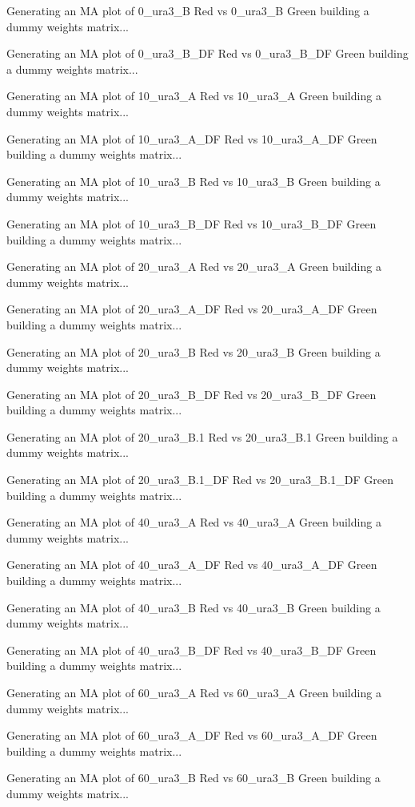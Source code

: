 \documentclass[titlepage]{article}
\begin{document}
\begin{Schunk}
\begin{Soutput}
Generating an MA plot of  0_ura3_B Red vs 0_ura3_B Green 
building a dummy weights matrix... 

Generating an MA plot of  0_ura3_B_DF Red vs 0_ura3_B_DF Green 
building a dummy weights matrix... 

Generating an MA plot of  10_ura3_A Red vs 10_ura3_A Green 
building a dummy weights matrix... 

Generating an MA plot of  10_ura3_A_DF Red vs 10_ura3_A_DF Green 
building a dummy weights matrix... 

Generating an MA plot of  10_ura3_B Red vs 10_ura3_B Green 
building a dummy weights matrix... 

Generating an MA plot of  10_ura3_B_DF Red vs 10_ura3_B_DF Green 
building a dummy weights matrix... 

Generating an MA plot of  20_ura3_A Red vs 20_ura3_A Green 
building a dummy weights matrix... 

Generating an MA plot of  20_ura3_A_DF Red vs 20_ura3_A_DF Green 
building a dummy weights matrix... 

Generating an MA plot of  20_ura3_B Red vs 20_ura3_B Green 
building a dummy weights matrix... 

Generating an MA plot of  20_ura3_B_DF Red vs 20_ura3_B_DF Green 
building a dummy weights matrix... 

Generating an MA plot of  20_ura3_B.1 Red vs 20_ura3_B.1 Green 
building a dummy weights matrix... 

Generating an MA plot of  20_ura3_B.1_DF Red vs 20_ura3_B.1_DF Green 
building a dummy weights matrix... 

Generating an MA plot of  40_ura3_A Red vs 40_ura3_A Green 
building a dummy weights matrix... 

Generating an MA plot of  40_ura3_A_DF Red vs 40_ura3_A_DF Green 
building a dummy weights matrix... 

Generating an MA plot of  40_ura3_B Red vs 40_ura3_B Green 
building a dummy weights matrix... 

Generating an MA plot of  40_ura3_B_DF Red vs 40_ura3_B_DF Green 
building a dummy weights matrix... 

Generating an MA plot of  60_ura3_A Red vs 60_ura3_A Green 
building a dummy weights matrix... 

Generating an MA plot of  60_ura3_A_DF Red vs 60_ura3_A_DF Green 
building a dummy weights matrix... 

Generating an MA plot of  60_ura3_B Red vs 60_ura3_B Green 
building a dummy weights matrix... 


\end{Soutput}
\end{Schunk}
\end{document}
